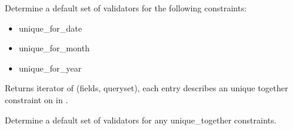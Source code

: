 \documentclass[letterpaper,10pt,english]{sphinxmanual}
\begin{document}
\begin{fulllineitems}
\begin{fulllineitems}
\label{\detokenize{tasks:tasks.serializers.TaskSerializer.get_unique_for_date_validators}}
\pysigstartsignatures
{}
\pysigstopsignatures
\sphinxAtStartPar
Determine a default set of validators for the following constraints:
\begin{itemize}
\item {} 
\sphinxAtStartPar
unique\_for\_date

\item {} 
\sphinxAtStartPar
unique\_for\_month

\item {} 
\sphinxAtStartPar
unique\_for\_year

\end{itemize}

\end{fulllineitems}


\begin{fulllineitems}
\label{\detokenize{tasks:tasks.serializers.TaskSerializer.get_unique_together_constraints}}
\pysigstartsignatures
{}
\pysigstopsignatures
\sphinxAtStartPar
Returns iterator of (fields, queryset), each entry describes an unique together
constraint on  in .

\end{fulllineitems}


\begin{fulllineitems}
\label{\detokenize{tasks:tasks.serializers.TaskSerializer.get_unique_together_validators}}
\pysigstartsignatures
{}
\pysigstopsignatures
\sphinxAtStartPar
Determine a default set of validators for any unique\_together constraints.

\end{fulllineitems}


\end{fulllineitems}
\end{document}
